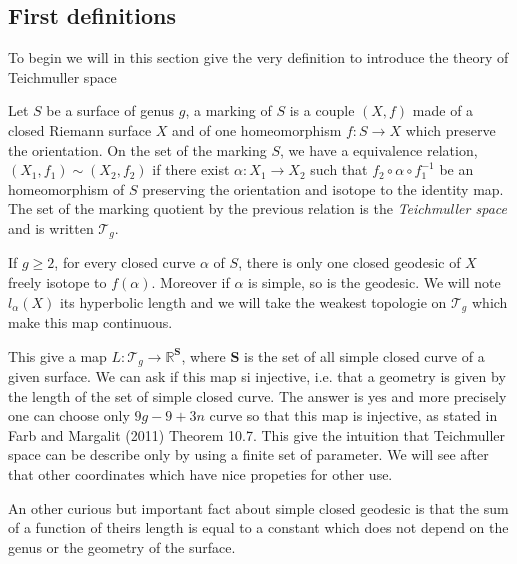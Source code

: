 \subsection{First definitions}

To begin we will in this section give the very definition to introduce the theory of Teichmuller space

\begin{dfnt}
Let $S$ be a surface of genus $g$, a marking of $S$ is a couple $(X,f)$ made of a closed Riemann surface $X$ and of one homeomorphism $f:S \to X$ which preserve the orientation.
On the set of the marking $S$, we have a equivalence relation,  $(X_1,f_1) \sim (X_2,f_2)$ if there exist $\alpha : X_1 \to X_2 $ such that $f_2 \circ \alpha \circ f_1^{-1}$ be an homeomorphism of $S$ preserving the orientation and isotope to the identity map.%
The set of the marking quotient by the previous relation is the \emph{Teichmuller space} and is written $\mathcal{T}_g$.
\end{dfnt}

\begin{rmq}
If $g \geq 2$, for every closed curve $\alpha$ of $S$, there is only one closed geodesic of $X$ freely isotope to $f(\alpha)$. Moreover if $\alpha$ is simple, so is the geodesic. We will note $l_{\alpha}(X)$ its hyperbolic length and we will take the weakest topologie on $\mathcal{T}_g$ which make this map continuous.
\end{rmq}

This give a map $L: \mathcal{T}_g \to \mathbb{R}^{\mathbf{S}}$, where $\mathbf{S}$ is the set of all simple closed curve of a given surface. We can ask if this map si injective, i.e. that a geometry is given by the length of the set of simple closed curve. The answer is yes and more precisely one can choose only $9g-9+3n$ curve so that this map is injective, as stated in Farb and Margalit (2011) Theorem 10.7. \cite{farb2011primer} %
This give the intuition that Teichmuller space can be describe only by using a finite set of parameter. We will see after that other coordinates which have nice propeties for other use.


An other curious but important fact about simple closed geodesic is that the sum of a function of theirs length is equal to a constant which does not depend on the genus or the geometry of the surface.

